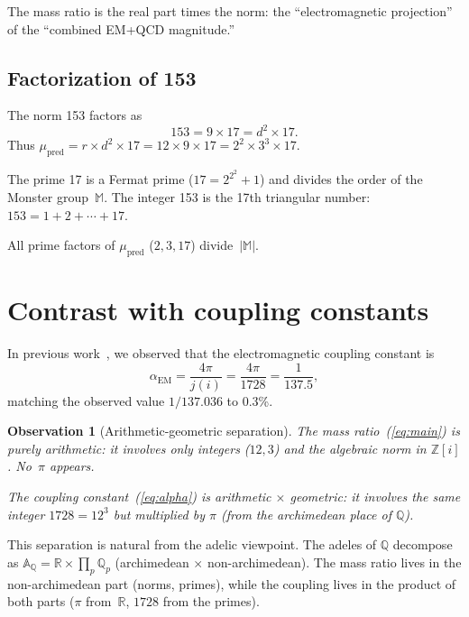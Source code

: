 \documentclass[aps,prl,twocolumn,superscriptaddress,nofootinbib]{revtex4-2}
\newtheorem{observation}[theorem]{Observation}
\newcommand{\Z}{\mathbb{Z}}
\newcommand{\Q}{\mathbb{Q}}
\begin{document}
The mass ratio is the real part times the norm:
the ``electromagnetic projection'' of the ``combined EM+QCD magnitude.''

\subsection{Factorization of 153}

The norm 153 factors as
\begin{equation}
  153 = 9 \times 17 = d^2 \times 17.
\end{equation}
Thus $\mu_{\mathrm{pred}} = r \times d^2 \times 17
= 12 \times 9 \times 17 = 2^2 \times 3^3 \times 17$.

The prime 17 is a Fermat prime ($17 = 2^{2^2} + 1$)
and divides the order of the Monster group~$\mathbb{M}$.
The integer 153 is the 17th triangular number:
$153 = 1 + 2 + \cdots + 17$.

All prime factors of $\mu_{\mathrm{pred}}$
($2, 3, 17$) divide~$|\mathbb{M}|$.

\section{Contrast with coupling constants}

In previous work~\cite{WB_moonshine}, we observed that the
electromagnetic coupling constant is
\begin{equation}
  \alpha_{\mathrm{EM}} = \frac{4\pi}{j(i)} = \frac{4\pi}{1728}
  = \frac{1}{137.5},
  \label{eq:alpha}
\end{equation}
matching the observed value $1/137.036$ to 0.3\%.

\begin{observation}[Arithmetic-geometric separation]
The mass ratio~(\ref{eq:main}) is \emph{purely arithmetic}:
it involves only integers ($12, 3$) and the algebraic norm
in $\Z[i]$.
No~$\pi$ appears.

The coupling constant~(\ref{eq:alpha}) is
\emph{arithmetic $\times$ geometric}: it involves the same
integer $1728 = 12^3$ but multiplied by $\pi$
(from the archimedean place of $\Q$).
\end{observation}

This separation is natural from the adelic viewpoint.
The adeles of $\Q$ decompose as
$\mathbb{A}_\Q = \mathbb{R} \times \prod_p \Q_p$
(archimedean $\times$ non-archimedean).
The mass ratio lives in the non-archimedean part (norms, primes),
while the coupling lives in the product of both parts
($\pi$ from~$\mathbb{R}$, $1728$ from the primes).
\end{document}
